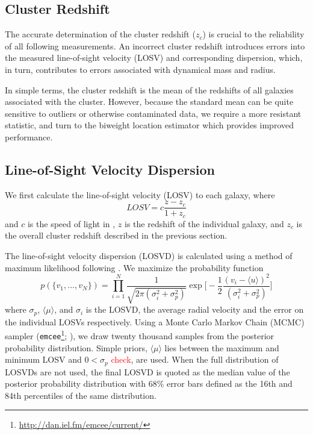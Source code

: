 \documentclass[fleqn,usenatbib]{mnras}
\newcommand{\editorial}[1]{\textcolor{red}{#1}}
\begin{document}
\subsection{Cluster Redshift}
The accurate determination of the cluster redshift ($z_c$) is crucial to the reliability of all following measurements. An incorrect cluster redshift introduces errors into the measured line-of-sight velocity (LOSV) and corresponding dispersion, which, in turn, contributes to errors associated with dynamical mass and radius. 

In simple terms, the cluster redshift is the mean of the redshifts of all galaxies associated with the cluster. However, because the standard mean can be quite sensitive to outliers or otherwise contaminated data, we require a more resistant statistic, and turn to the biweight location estimator \citep{Beers1990} which provides improved performance. 

\subsection{Line-of-Sight Velocity Dispersion}\label{sec: LOSVD}
We first calculate the line-of-sight velocity (LOSV) to each galaxy, where
\begin{equation}
	LOSV = c\frac{z - z_c}{1+z_c}
\end{equation}
and $c$ is the speed of light in \kms, $z$ is the redshift of the individual galaxy, and $z_c$ is the overall cluster redshift described in the previous section.

The line-of-sight velocity dispersion (LOSVD) is calculated using a method of maximum likelihood following \cite{Walker2006}. We maximize the probability function 
\begin{equation}
  \label{eq: jointGaussian}
p(\{v_1, ..., v_N\})=\displaystyle\prod_{i=1}^{N}\frac{1}{\sqrt{2\pi(\sigma_i^2+\sigma_p^2)}}\exp\biggl[-\frac{1}{2}\frac{(v_i-\langle u \rangle)^2}{(\sigma_i^2+\sigma_p^2)}\biggr]
\end{equation}
where $\sigma_p$, $\langle\mu\rangle$, and $\sigma_i$ is the LOSVD, the average radial velocity and the error on the individual LOSVs respectively. Using a Monte Carlo Markov Chain (MCMC) sampler ({\tt emcee}\footnote{\url{http://dan.iel.fm/emcee/current/}}; \citealt{Foreman-Mackey2013}), we draw twenty thousand samples from the posterior probability distribution. Simple priors, $\langle\mu\rangle$ lies between the maximum and minimum LOSV and $0< \sigma_p$ \editorial{check}, are used. When the full distribution of LOSVDs are not used, the final LOSVD is quoted as the median value of the posterior probability distribution with 68\% error bars defined as the 16th and 84th percentiles of the same distribution.
\end{document}
